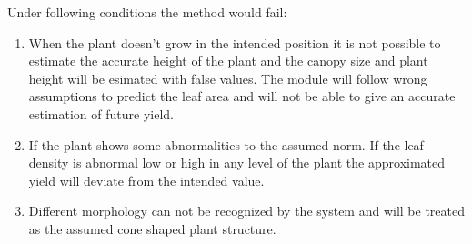 Under following conditions the method would fail:

\begin{enumerate}
    \item When the plant doesn't grow in the intended position it is not possible to estimate the accurate height of the plant and the canopy size and plant height will be esimated with false values. The module will follow wrong assumptions to predict the leaf area and will not be able to give an accurate estimation of future yield.

    \item If the plant shows some abnormalities to the assumed norm. If the leaf density is abnormal low or high in any level of the plant the approximated yield will deviate from the intended value.

    \item Different morphology can not be recognized by the system and will be treated as the assumed cone shaped plant structure.
\end{enumerate}
